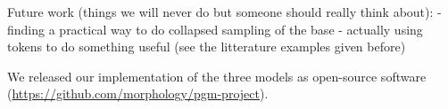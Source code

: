 Future work (things we will never do but someone should really think about):
- finding a practical way to do collapsed sampling of the base
- actually using tokens to do something useful (see the litterature examples given before)

We released our implementation of the three models as open-source software (\url{https://github.com/morphology/pgm-project}).
